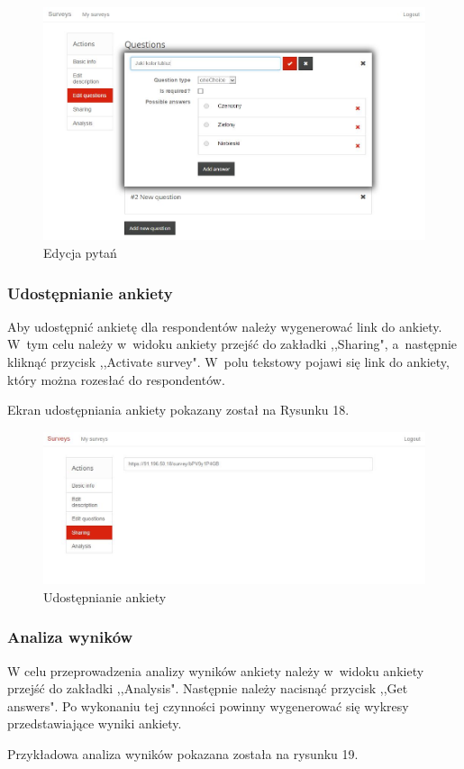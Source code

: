 \documentclass[8pt,a4paper,notitlepage]{article}
\begin{document}
\begin{figure}[H]
    \centering
    \includegraphics[width=\linewidth]{obrazy/edycjaPytan}
    \caption{Edycja pytań}
\end{figure} 

\subsubsection{Udostępnianie ankiety}
Aby udostępnić ankietę dla respondentów należy wygenerować link do ankiety. W~tym celu należy w~widoku ankiety przejść do zakładki ,,Sharing", a~następnie kliknąć przycisk ,,Activate survey". W~polu tekstowy pojawi się link do ankiety, który można rozesłać do respondentów.
\par Ekran udostępniania ankiety pokazany został na Rysunku 18.

\begin{figure}[H]
    \centering
    \includegraphics[width=\linewidth]{obrazy/sharing}
    \caption{Udostępnianie ankiety}
\end{figure} 

\subsubsection{Analiza wyników}
W celu przeprowadzenia analizy wyników ankiety należy w~widoku ankiety przejść do zakładki ,,Analysis". Następnie należy nacisnąć przycisk ,,Get answers". Po wykonaniu tej czynności powinny wygenerować się wykresy przedstawiające wyniki ankiety.
\par Przykładowa analiza wyników pokazana została na rysunku 19.
\end{document}
